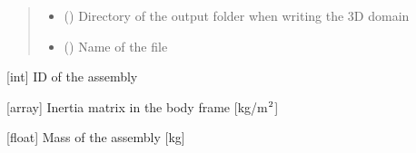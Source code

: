 \documentclass[letterpaper,10pt,english]{sphinxmanual}
\begin{document}
\begin{fulllineitems}
\begin{fulllineitems}
\begin{quote}
\begin{description}
\begin{itemize}
\item {} 
\sphinxAtStartPar
{} () \textendash{} Directory of the output folder when writing the 3D domain

\item {} 
\sphinxAtStartPar
{} () \textendash{} Name of the file

\end{itemize}

\end{description}\end{quote}

\end{fulllineitems}


\begin{fulllineitems}
\label{\detokenize{modules:assembly.Assembly.id}}
\pysigstartsignatures
{}
\pysigstopsignatures
\sphinxAtStartPar
{[}int{]} ID of the assembly

\end{fulllineitems}


\begin{fulllineitems}
\label{\detokenize{modules:assembly.Assembly.inertia}}
\pysigstartsignatures
{}
\pysigstopsignatures
\sphinxAtStartPar
{[}array{]} Inertia matrix in the body frame {[}kg/m\(\sp{\text{2}}\){]}

\end{fulllineitems}


\begin{fulllineitems}
\label{\detokenize{modules:assembly.Assembly.mass}}
\pysigstartsignatures
{}
\pysigstopsignatures
\sphinxAtStartPar
{[}float{]} Mass of the assembly {[}kg{]}

\end{fulllineitems}



\end{fulllineitems}
\end{document}
